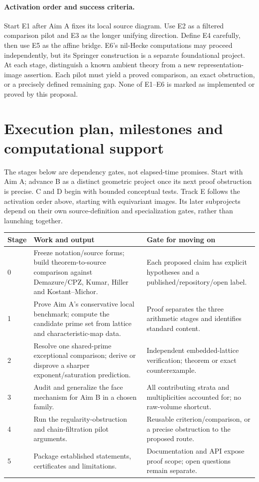 \documentclass[11pt,letterpaper]{article}
\begin{document}
\paragraph{Activation order and success criteria.}
Start E1 after Aim A fixes its local source diagram. Use E2 as a filtered
comparison pilot and E3 as the longer unifying direction.
Define E4 carefully, then use E5 as the affine bridge. E6's nil-Hecke
computations may proceed independently, but its Springer construction
is a separate foundational project.
At each stage, distinguish a known ambient theory from a new
representation-image assertion. Each pilot must yield a proved
comparison, an exact obstruction, or a precisely defined remaining gap.
None of E1--E6 is marked as implemented or proved by this proposal.

\newpage
\section{Execution plan, milestones and computational support}
The stages below are dependency gates, not elapsed-time promises.
Start with Aim A; advance B as a distinct geometric project once its next
proof obstruction is precise. C and D begin with bounded conceptual tests.
Track E follows the activation order above, starting with equivariant
images. Its later subprojects depend on their own source-definition and
specialization gates, rather than launching together.

\noindent\begin{tabularx}{\linewidth}{@{}p{0.65in}YY@{}}
\toprule
Stage & Work and output & Gate for moving on\\
 & Freeze notation/source forms; build theorem-to-source comparison
against Demazure/CPZ, Kumar, Hiller and Kostant--Michor. &
Each proposed claim has explicit hypotheses and a published/repository/open label.\\
1 & Prove Aim A's conservative local benchmark; compute the candidate prime
set from lattice and characteristic-map data. &
Proof separates the three arithmetic stages and identifies standard content.\\
2 & Resolve one shared-prime exceptional comparison; derive or disprove a
sharper exponent/saturation prediction. &
Independent embedded-lattice verification; theorem or exact counterexample.\\
3 & Audit and generalize the face mechanism for Aim B in a chosen family. &
All contributing strata and multiplicities accounted for; no raw-volume shortcut.\\
4 & Run the regularity-obstruction and chain-filtration pilot arguments. &
Reusable criterion/comparison, or a precise obstruction to the proposed route.\\
5 & Package established statements, certificates and limitations. &
Documentation and API expose proof scope; open questions remain separate.\\
\bottomrule
\end{tabularx}
\end{document}
